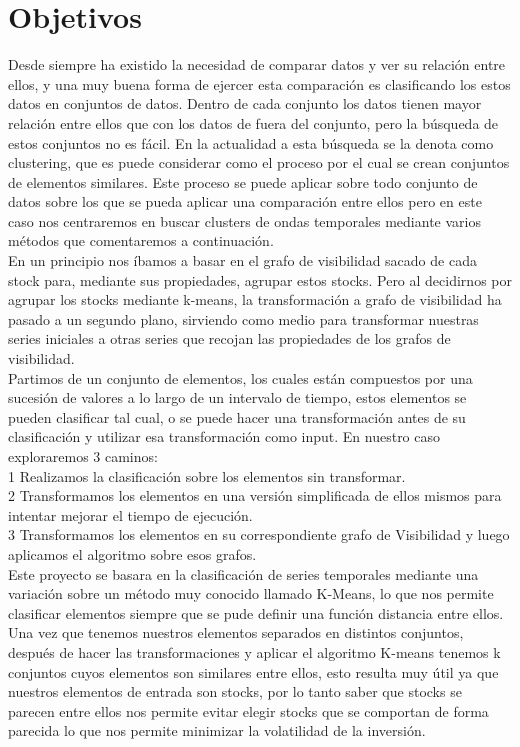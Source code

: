 \documentclass[12pt,a4paper]{article}
\begin{document}
	\section{Objetivos}
	\vspace{1cm}
Desde siempre ha existido la necesidad de comparar datos y ver su relación entre ellos, y una muy buena forma de ejercer esta comparación es clasificando los estos datos en conjuntos de datos. Dentro de cada conjunto los datos tienen mayor relación entre ellos que con los datos de fuera del conjunto, pero la búsqueda de estos conjuntos no es fácil. En la actualidad a esta búsqueda se la denota como clustering, que es puede considerar como el proceso por el cual se crean conjuntos de elementos similares. Este proceso se puede aplicar sobre todo conjunto de datos sobre los que se pueda aplicar una comparación entre ellos pero en este caso nos centraremos en buscar clusters de ondas temporales mediante varios métodos que comentaremos a continuación.\\
En un principio nos íbamos a basar en el grafo de visibilidad sacado de cada stock para, mediante sus propiedades, agrupar estos stocks. Pero al decidirnos por agrupar los stocks mediante k-means, la transformación a grafo de visibilidad ha pasado a un segundo plano, sirviendo como medio para transformar nuestras series iniciales a otras series que recojan las propiedades de los grafos de visibilidad.\\
Partimos de un conjunto de elementos, los cuales están compuestos por una sucesión de valores a lo largo de un intervalo de tiempo, estos elementos se pueden clasificar tal cual, o se puede hacer una transformación antes de su clasificación y utilizar esa transformación como input. En nuestro caso exploraremos 3 caminos:\\
1 Realizamos la clasificación sobre los elementos sin transformar.\\
2 Transformamos los elementos en una versión simplificada de ellos mismos para intentar mejorar el tiempo de ejecución.\\
3 Transformamos los elementos en su correspondiente grafo de Visibilidad y luego aplicamos el algoritmo sobre esos grafos.\\
Este proyecto se basara en la clasificación de series temporales mediante una variación sobre un método muy conocido llamado K-Means, lo que nos permite clasificar elementos siempre que se pude definir una función distancia entre ellos.\\
Una vez que tenemos nuestros elementos separados en distintos conjuntos, después de hacer las transformaciones y aplicar el algoritmo K-means tenemos k conjuntos cuyos elementos son similares entre ellos, esto resulta muy útil ya que nuestros elementos de entrada son stocks, por lo tanto saber que stocks se parecen entre ellos nos permite evitar elegir stocks que se comportan de forma parecida lo que nos permite minimizar la volatilidad de la inversión.
\end{document}
